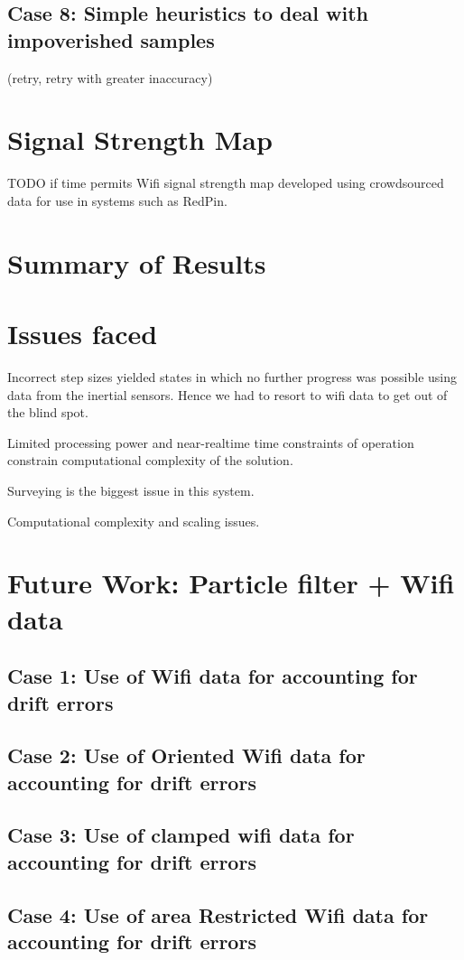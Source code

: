 \subsection{Case 8: Simple heuristics to deal with impoverished samples}
(retry, retry with greater inaccuracy)

\section{Signal Strength Map}

TODO if time permits
Wifi signal strength map developed using crowdsourced data for use in systems such as RedPin.

\section{Summary of Results}

\section{Issues faced}
Incorrect step sizes yielded states in which no further progress was possible
using data from the inertial sensors. Hence we had to resort to wifi data to get
out of the blind spot.

Limited processing power and near-realtime time constraints of operation
constrain computational complexity of the solution.

Surveying is the biggest issue in this system.

Computational complexity and scaling issues.


\section{Future Work: Particle filter + Wifi data}

\subsection{Case 1: Use of Wifi data for accounting for drift errors}
\subsection{Case 2: Use of Oriented Wifi data for accounting for drift errors}
\subsection{Case 3: Use of clamped wifi data for accounting for drift errors}
\subsection{Case 4: Use of area Restricted Wifi data for accounting for drift errors}

